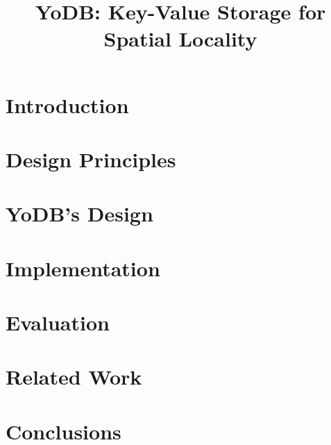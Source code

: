 \documentclass[sigplan,10pt]{acmart}
\date{}
\newcommand{\sys}{YoDB}
\begin{document}
\title{\sys: Key-Value Storage for Spatial Locality} 
\author{}

\begin{abstract}

\end{abstract}

\maketitle

\section{Introduction}


\section{Design Principles}
\label{sec:principles}

\section{\sys's Design}
\label{sec:design}


\section{Implementation}
\label{sec:impl}


\section{Evaluation}
\label{sec:eval}


\section{Related Work}
\label{sec:related}


\section{Conclusions}
\label{sec:conclusions}


%

\clearpage
{\normalsize 
}

\end{document}
